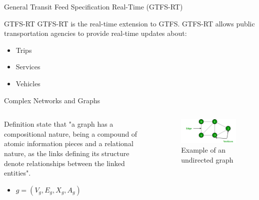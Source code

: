 \documentclass[xcolor=dvipsnames,table]{beamer}
\begin{document}
\begin{frame}{General Transit Feed Specification Real-Time (GTFS-RT)}
        \begin{block}{GTFS-RT}
                GTFS-RT is the real-time extension to GTFS. GTFS-RT allows public transportation agencies to provide real-time updates about:
                \begin{itemize}
                        \item Trips
                        \item Services
                        \item Vehicles
                \end{itemize}
        \end{block}
\end{frame}
\begin{frame}{Complex Networks and Graphs}
        \begin{columns}
                \begin{block}{Definition}
                        \citealp{Bacciu_2020} state that "a graph has a compositional nature, being 
                        a compound of atomic information pieces and a relational nature, as the links
                        defining its structure denote relationships between the linked entities".

                        \begin{itemize}
                                \item \textit{$g = (V_g, E_g, X_g, A_g)$}
                        \end{itemize}
                \end{block}
                \centering
                \begin{figure}[H]
                        \centering
                        \includegraphics[scale=0.35]{images/undirectedgraph.png}
                        \caption{Example of an undirected graph}
                \end{figure}
        \end{columns}
\end{frame}
\end{document}
